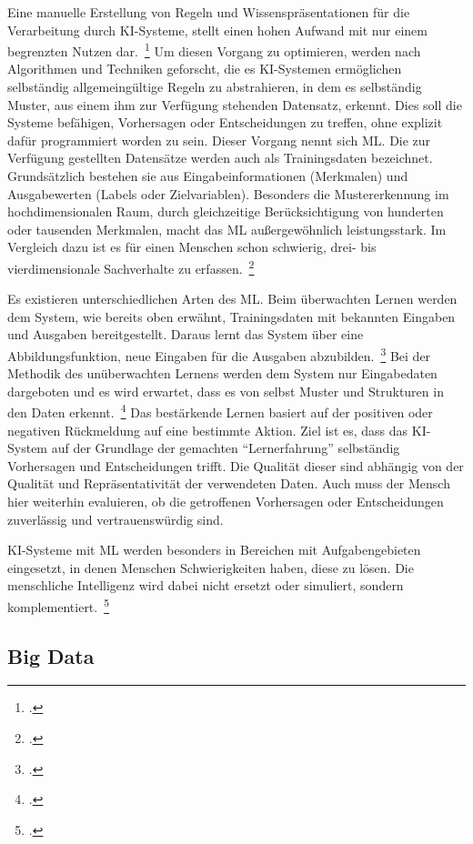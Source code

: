 Eine manuelle Erstellung von Regeln und Wissenspräsentationen für die Verarbeitung durch \ac{KI}-Systeme, stellt einen hohen Aufwand mit nur einem begrenzten Nutzen dar.~\footcite[\vglf][]{Matzka.2021}
Um diesen Vorgang zu optimieren, werden nach Algorithmen und Techniken geforscht, die es \ac{KI}-Systemen ermöglichen selbständig allgemeingültige Regeln zu abstrahieren, in dem es selbständig Muster, aus einem ihm zur Verfügung stehenden
Datensatz, erkennt. Dies soll die Systeme befähigen, Vorhersagen oder Entscheidungen zu treffen, ohne explizit dafür programmiert worden zu sein. Dieser Vorgang nennt sich \ac{ML}.
Die zur Verfügung gestellten Datensätze werden auch als Trainingsdaten bezeichnet. Grundsätzlich bestehen sie aus Eingabeinformationen (Merkmalen) und Ausgabewerten (Labels oder Zielvariablen).
Besonders die Mustererkennung im hochdimensionalen Raum, durch gleichzeitige Berücksichtigung von hunderten oder tausenden Merkmalen, macht das \ac{ML} außergewöhnlich leistungsstark. Im Vergleich dazu ist es für einen Menschen
schon schwierig, drei- bis vierdimensionale Sachverhalte zu erfassen.~\footcite[\vglf][]{Matzka.2021}

Es existieren unterschiedlichen Arten des \ac{ML}. Beim überwachten Lernen werden dem System, wie bereits oben erwähnt, Trainingsdaten mit bekannten Eingaben und Ausgaben bereitgestellt. Daraus lernt 
das System über eine Abbildungsfunktion, neue Eingaben für die Ausgaben abzubilden.~\footcite[\vglf][]{Plaue.2021} Bei der Methodik des unüberwachten Lernens werden dem System nur Eingabedaten dargeboten und es wird erwartet,
dass es von selbst Muster und Strukturen in den Daten erkennt.~\footcite[\vglf][]{Plaue.2021} 
Das bestärkende Lernen basiert auf der positiven oder negativen Rückmeldung auf eine bestimmte Aktion. 
Ziel ist es, dass das \ac{KI}-System auf der Grundlage der gemachten \enquote{Lernerfahrung} selbständig Vorhersagen und Entscheidungen trifft. 
Die Qualität dieser sind abhängig von der Qualität und Repräsentativität der verwendeten Daten. Auch muss der Mensch hier weiterhin evaluieren, ob die getroffenen Vorhersagen oder Entscheidungen
zuverlässig und vertrauenswürdig sind.

\ac{KI}-Systeme mit \ac{ML} werden besonders in Bereichen mit Aufgabengebieten eingesetzt, in denen Menschen Schwierigkeiten haben, diese zu lösen. Die menschliche Intelligenz wird dabei nicht ersetzt
oder simuliert, sondern komplementiert.~\footcite[\vglf][]{Matzka.2021}


\subsection{Big Data}

